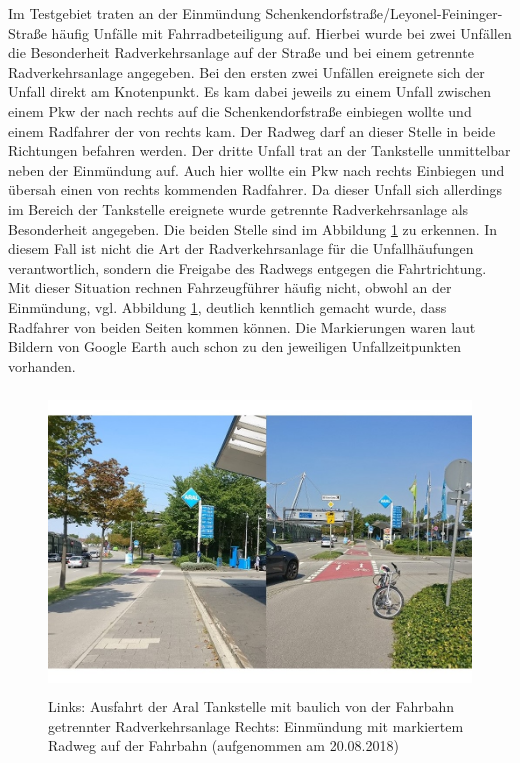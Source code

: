 Im Testgebiet traten an der Einmündung Schenkendorfstraße/Leyonel-Feininger-Straße häufig Unfälle mit Fahrradbeteiligung auf. Hierbei wurde bei zwei Unfällen die Besonderheit Radverkehrsanlage auf der Straße und bei einem getrennte Radverkehrsanlage angegeben. Bei den ersten zwei Unfällen ereignete sich der Unfall direkt am Knotenpunkt. Es kam dabei jeweils zu einem Unfall zwischen einem Pkw der nach rechts auf die Schenkendorfstraße einbiegen wollte und einem Radfahrer der von rechts kam. Der Radweg darf an dieser Stelle in beide Richtungen befahren werden. Der dritte Unfall trat an der Tankstelle unmittelbar neben der Einmündung auf. Auch hier wollte ein Pkw nach rechts Einbiegen und übersah einen von rechts kommenden Radfahrer. Da dieser Unfall sich allerdings im Bereich der Tankstelle ereignete wurde getrennte Radverkehrsanlage als Besonderheit angegeben. Die beiden Stelle sind im Abbildung \ref{fig:Lyonel-Feininger} zu erkennen. In diesem Fall ist nicht die Art der Radverkehrsanlage für die Unfallhäufungen verantwortlich, sondern die Freigabe des Radwegs entgegen die Fahrtrichtung. Mit dieser Situation rechnen Fahrzeugführer häufig nicht, obwohl an der Einmündung, vgl. Abbildung \ref{fig:Lyonel-Feininger}, deutlich kenntlich gemacht wurde, dass Radfahrer von beiden Seiten kommen können. Die Markierungen waren laut Bildern von Google Earth auch schon zu den jeweiligen Unfallzeitpunkten vorhanden.

\begin{savenotes}
	\begin{figure}[H]
		\centering
		\includegraphics[width=12cm,height=8cm]{figures/Lyonel_Feininger}
		\caption[Ausfahrt Aral Tankstelle und Einmündung Lyonel-Feininger-Straße]{Links: Ausfahrt der Aral Tankstelle mit baulich von der Fahrbahn getrennter Radverkehrsanlage Rechts: Einmündung mit markiertem Radweg auf der Fahrbahn (aufgenommen am 20.08.2018)}\label{fig:Lyonel-Feininger}
	\end{figure}
\end{savenotes}

